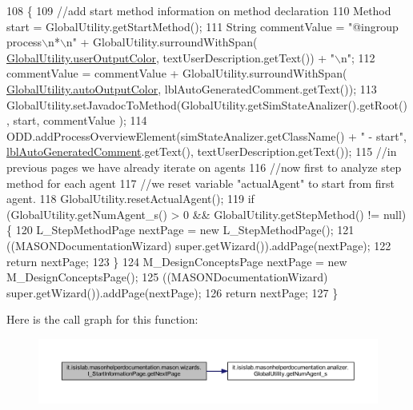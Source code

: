 \begin{DoxyCode}
108                                     \{ 
109         \textcolor{comment}{//add start method information on method declaration}
110         Method start = GlobalUtility.getStartMethod();
111         String commentValue = \textcolor{stringliteral}{"@ingroup process\(\backslash\)n*\(\backslash\)n"} + GlobalUtility.surroundWithSpan(
      \hyperlink{classit_1_1isislab_1_1masonhelperdocumentation_1_1analizer_1_1_global_utility_aec864cd710b27ece609c5a6093211ff4}{GlobalUtility.userOutputColor}, textUserDescription.getText()) + \textcolor{stringliteral}{"\(\backslash\)n"};
112         commentValue = commentValue + GlobalUtility.surroundWithSpan(
      \hyperlink{classit_1_1isislab_1_1masonhelperdocumentation_1_1analizer_1_1_global_utility_a42aa676ad1ff27c42cd4aab651ff2a35}{GlobalUtility.autoOutputColor}, lblAutoGeneratedComment.getText());
113         GlobalUtility.setJavadocToMethod(GlobalUtility.getSimStateAnalizer().getRoot(), start, commentValue
      );
114         ODD.addProcessOverviewElement(simStateAnalizer.getClassName() + \textcolor{stringliteral}{" - start"}, 
      \hyperlink{classit_1_1isislab_1_1masonhelperdocumentation_1_1mason_1_1wizards_1_1_i___start_information_page_a71b48bb46faed54b4236b3d52a074580}{lblAutoGeneratedComment}.getText(), textUserDescription.getText());
115         \textcolor{comment}{//in previous pages we have already iterate on agents}
116         \textcolor{comment}{//now first to analyze step method for each agent}
117         \textcolor{comment}{//we reset variable "actualAgent" to start from first agent.}
118         GlobalUtility.resetActualAgent();
119         \textcolor{keywordflow}{if} (GlobalUtility.getNumAgent\_s() > 0 && GlobalUtility.getStepMethod() != null)\{
120             L\_StepMethodPage nextPage = \textcolor{keyword}{new} L\_StepMethodPage();
121             ((MASONDocumentationWizard) super.getWizard()).addPage(nextPage);
122             \textcolor{keywordflow}{return} nextPage;
123         \}
124         M\_DesignConceptsPage nextPage = \textcolor{keyword}{new} M\_DesignConceptsPage();
125         ((MASONDocumentationWizard) super.getWizard()).addPage(nextPage);
126         \textcolor{keywordflow}{return} nextPage;
127     \}
\end{DoxyCode}


Here is the call graph for this function\-:
\nopagebreak
\begin{figure}[H]
\begin{center}
\leavevmode
\includegraphics[width=350pt]{classit_1_1isislab_1_1masonhelperdocumentation_1_1mason_1_1wizards_1_1_i___start_information_page_af04d37e7abfe04292439e4df5d63ceb8_cgraph}
\end{center}
\end{figure}


